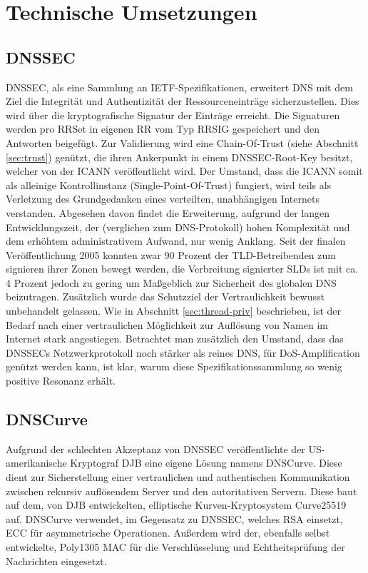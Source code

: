 \chapter{Technische Umsetzungen}
\label{chap:technologies}

\section{DNSSEC}
\label{sec:tec-dnssec}
DNSSEC, als eine Sammlung an IETF-Spezifikationen, erweitert DNS mit dem Ziel die Integrität und Authentizität der Ressourceneinträge sicherzustellen\cite{Arends2005}. Dies wird über die kryptografische Signatur der Einträge erreicht. Die Signaturen werden pro RRSet in eigenen RR vom Typ RRSIG gespeichert und den Antworten beigefügt. Zur Validierung wird eine Chain-Of-Trust (siehe Abschnitt \ref{sec:trust}) genützt, die ihren Ankerpunkt in einem \ac{DNSSEC}-Root-Key besitzt, welcher von der ICANN veröffentlicht wird. Der Umstand, dass die ICANN somit als alleinige Kontrollinstanz (Single-Point-Of-Trust) fungiert, wird teils als Verletzung des Grundgedanken eines verteilten, unabhängigen Internets verstanden\cite{Finch2014}.
Abgesehen davon findet die Erweiterung, aufgrund der langen Entwicklungszeit, der (verglichen zum DNS-Protokoll) hohen Komplexität und dem erhöhtem administrativem Aufwand, nur wenig Anklang. Seit der finalen Veröffentlichung 2005 konnten zwar 90 Prozent der TLD-Betreibenden zum signieren ihrer Zonen bewegt werden, die Verbreitung signierter SLDs ist mit ca. 4 Prozent jedoch zu gering um Maßgeblich zur Sicherheit des globalen DNS beizutragen\cite{DCCommunications2018}. Zusätzlich wurde das Schutzziel der Vertraulichkeit bewusst unbehandelt gelassen. Wie in Abschnitt \ref{sec:thread-priv} beschrieben, ist der Bedarf nach einer vertraulichen Möglichkeit zur Auflösung von Namen im Internet stark angestiegen. Betrachtet man zusätzlich den Umstand, dass das \ac{DNSSEC}s Netzwerkprotokoll noch stärker als reines DNS, für \ac{DoS}-Amplification genützt werden kann, ist klar, warum diese Spezifikationssammlung so wenig positive Resonanz erhält\cite{Antic2014}.

\section{DNSCurve}
\label{sec:tec-dnscurve}
Aufgrund der schlechten Akzeptanz von \ac{DNSSEC} veröffentlichte der US-amerikanische Kryptograf \ac{DJB} eine eigene Lösung namens DNSCurve. Diese dient zur Sicherstellung einer vertraulichen und authentischen Kommunikation zwischen rekursiv auflösendem Server und den autoritativen Servern. Diese baut auf dem, von \ac{DJB} entwickelten, elliptische Kurven-Kryptosystem Curve25519 auf. DNSCurve verwendet, im Gegensatz zu \ac{DNSSEC}, welches RSA einsetzt, \ac{ECC} für asymmetrische Operationen. Außerdem wird der, ebenfalls selbst entwickelte, Poly1305 \ac{MAC} für die Verschlüsselung und Echtheitsprüfung der Nachrichten eingesetzt. 

